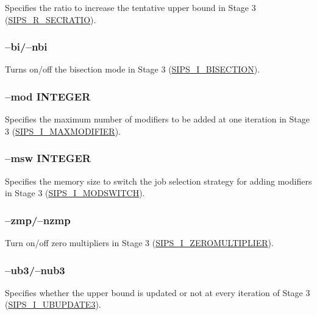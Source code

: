 \documentclass[a4paper]{book}
\begin{document}
Specifies the ratio to increase the tentative upper bound in Stage 3\linebreak
(\hyperlink{SECRATIO}{SIPS\_R\_SECRATIO}).

\subsubsection{--bi/--nbi}

Turns on/off the bisection mode in Stage 3
(\hyperlink{BISECTION}{SIPS\_I\_BISECTION}).

\subsubsection{--mod INTEGER}

Specifies the maximum number of modifiers to be added at one iteration in Stage 3
(\hyperlink{MAXMODIFIER}{SIPS\_I\_MAXMODIFIER}).

\subsubsection{--msw INTEGER}

Specifies the memory size to switch the job selection strategy for adding modifiers in Stage 3
(\hyperlink{MODSWITCH}{SIPS\_I\_MODSWITCH}).

\subsubsection{--zmp/--nzmp}

Turn on/off zero multipliers in Stage 3
(\hyperlink{ZEROMULTIPLIER}{SIPS\_I\_ZEROMULTIPLIER}).

\subsubsection{--ub3/--nub3}

Specifies whether the upper bound is updated or not at every iteration of Stage 3
(\hyperlink{UBUPDATE3}{SIPS\_I\_UBUPDATE3}).
\end{document}
